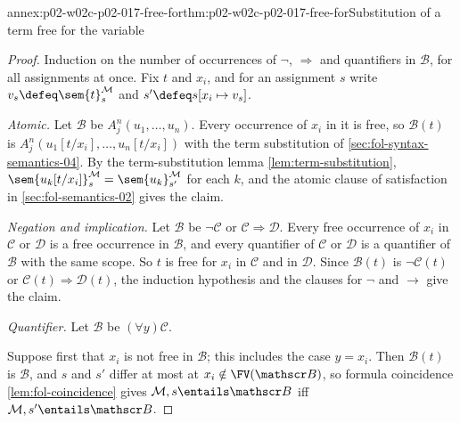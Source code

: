 \begin{annexitem}{annex:p02-w02c-p02-017-free-for}{thm:p02-w02c-p02-017-free-for}{Substitution of a term free for the variable}
\begin{proof}
Induction on the number of occurrences of \(\neg\), \(\Rightarrow\) and
quantifiers in \(\mathscr B\), for all assignments at once.  Fix \(t\) and
\(x_i\), and for an assignment \(s\) write
\(v_s\defeq\sem{t}^{\mathcal M}_{s}\) and
\(s'\defeq s[x_i\mapsto v_s]\).

\emph{Atomic.}  Let \(\mathscr B\) be \(A^n_j(u_1,\ldots,u_n)\).  Every
occurrence of \(x_i\) in it is free, so \(\mathscr B(t)\) is
\(A^n_j(u_1[t/x_i],\ldots,u_n[t/x_i])\) with the term substitution of
\cref{sec:fol-syntax-semantics-04}.  By the term-substitution lemma
\cref{lem:term-substitution},
\(\sem{u_k[t/x_i]}^{\mathcal M}_{s}
=\sem{u_k}^{\mathcal M}_{s'}\) for each \(k\), and the atomic
clause of satisfaction in \cref{sec:fol-semantics-02} gives the claim.

\emph{Negation and implication.}  Let \(\mathscr B\) be \(\neg\mathscr C\) or
\(\mathscr C\Rightarrow\mathscr D\).  Every free occurrence of \(x_i\) in
\(\mathscr C\) or \(\mathscr D\) is a free occurrence in \(\mathscr B\), and
every quantifier of \(\mathscr C\) or \(\mathscr D\) is a quantifier of
\(\mathscr B\) with the same scope.  So \(t\) is free for \(x_i\) in
\(\mathscr C\) and in \(\mathscr D\).  Since \(\mathscr B(t)\) is
\(\neg\mathscr C(t)\) or \(\mathscr C(t)\Rightarrow\mathscr D(t)\), the
induction hypothesis and the clauses for \(\neg\) and \(\to\) give the claim.

\emph{Quantifier.}  Let \(\mathscr B\) be \((\forall y)\mathscr C\).

Suppose first that \(x_i\) is not free in \(\mathscr B\); this includes the
case \(y=x_i\).  Then \(\mathscr B(t)\) is \(\mathscr B\), and \(s\) and
\(s'\) differ at most at \(x_i\notin\FV(\mathscr B)\), so formula coincidence
\cref{lem:fol-coincidence} gives
\(\mathcal M,s\entails\mathscr B\) iff \(\mathcal M,s'\entails\mathscr B\).


\end{proof}
\end{annexitem}
